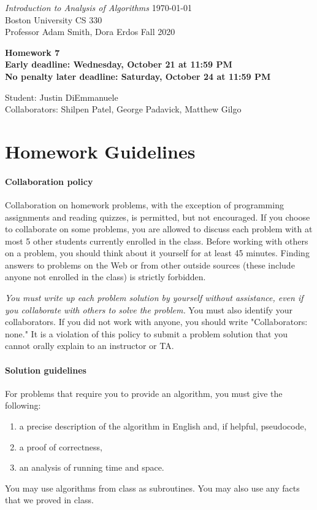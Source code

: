 \documentclass[letterpaper,11pt]{article}
\begin{document}
{\noindent\large
{\em Introduction to Analysis of Algorithms} \hfill \today\\
Boston University \hfill CS 330\\
Professor  Adam Smith, Dora Erdos \hfill Fall 2020\\}
\vspace{1pt}
\hrulefill\vspace{3mm}
\begin{center}
{\LARGE\bf Homework 7}\\
{\bf Early deadline: Wednesday, October 21 at 11:59 PM \\ No penalty later deadline: Saturday, October 24 at 11:59 PM}
\end{center}

\begin{center}
    \color{teal}
   Student: Justin DiEmmanuele \\
    Collaborators: Shilpen Patel, George Padavick, Matthew Gilgo
\end{center}

\section*{Homework Guidelines}

\paragraph{Collaboration policy} Collaboration on homework problems, with the exception of
programming assignments and reading quizzes, is permitted, but not encouraged.
If you
choose to collaborate on some problems, you are allowed to discuss
each problem with at most 5 other students currently enrolled in the
class.
Before working with others on a problem, you should think about it
yourself for at least 45 minutes. Finding answers to problems on the
Web or from other outside sources (these include anyone not enrolled
in the class) is strictly forbidden.

{\em You must write up each problem solution by yourself without
assistance, even if you collaborate with others to solve the
problem.} You must also identify your collaborators. If you did not
work with anyone, you should write "Collaborators: none." It is a
violation of this policy to submit a problem solution that you
cannot orally explain to an instructor or TA.

\paragraph{Solution guidelines} For problems that require you to provide an algorithm, you must give the following:
    \begin{enumerate}
\item  a precise description of the algorithm in English and, if helpful, pseudocode,
\item a proof of correctness,
\item an analysis of running time and space.
\end{enumerate}
You may use algorithms from class as subroutines. You may also use any facts that we proved in class.
\end{document}

